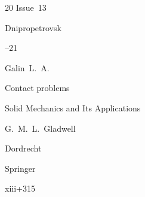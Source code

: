 \begin{thebibliography}{20}
\volinfo Issue~13

\publaddr Dnipropetrovsk


--21






\by Galin~L.~A.

\book Contact problems


\serial Solid Mechanics and Its Applications 


\ed G.~M.~L.~Gladwell

\publaddr Dordrecht

\publ Springer

\totalpages xiii+315 









\end{thebibliography}



\EngDate





\renewcommand{\baselinestretch}{0.9}



\newpage



\Russian 

 

%




%

%

